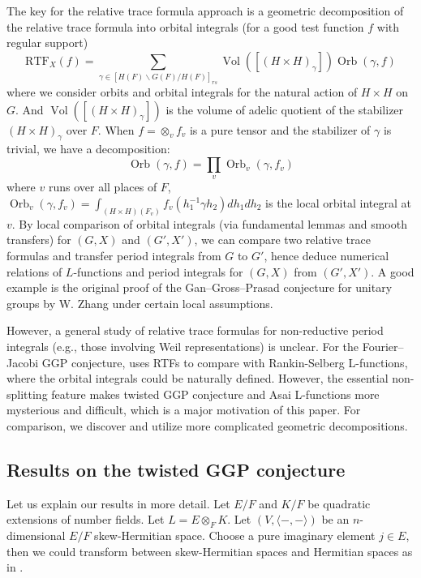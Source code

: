 \documentclass[11pt, reqno]{amsart}
\numberwithin{equation}{subsection}
\theoremstyle{plain}
\theoremstyle{definition}
\DeclareMathOperator{\Orb}{Orb}
\DeclareMathOperator{\Vol}{Vol}
\begin{document}
The key for the relative trace formula approach is a geometric decomposition of the relative trace formula into orbital integrals (for a good test function $f$ with regular support)
\[
\mathrm{RTF}_{X}(f)=\sum_{\gamma \in [H(F)\backslash G(F) / H(F)]_{rs}} \Vol([(H \times H)_\gamma]) \Orb(\gamma, f)
\]
where we consider orbits and orbital integrals for the natural action of $H \times H$ on $G$. And $\Vol([(H \times H)_\gamma])$ is the volume of adelic quotient of the stabilizer $(H \times H)_\gamma$ over $F$. When $f=\otimes_v f_v$ is a pure tensor and the stabilizer of $\gamma$ is trivial, we have a decomposition:
\[
\Orb(\gamma, f)= \prod_v \Orb_v(\gamma, f_v)
\]
where $v$ runs over all places of $F$, $\Orb_v(\gamma, f_v)=\int_{(H \times H)(F_v)} f_v(h_1^{-1} \gamma h_2) dh_1 dh_2$ is the local orbital integral at $v$. By local comparison of orbital integrals (via fundamental lemmas and smooth transfers) for $(G, X)$ and $(G', X')$, we can compare two relative trace formulas and transfer period integrals from $G$ to $G'$, hence deduce numerical relations of $L$-functions and period integrals for $(G, X)$ from $(G', X')$. A good example is the original proof of the Gan--Gross--Prasad conjecture for unitary groups by W. Zhang \cite{WeiIchinoIkeda14,WeiGGP14} under certain local assumptions. 

However, a general study of relative trace formulas for non-reductive period integrals (e.g., those involving Weil representations) is unclear. For the Fourier--Jacobi GGP conjecture, \cite{GGP-FourierJacobi} uses RTFs to compare with Rankin-Selberg L-functions, where the orbital integrals could be naturally defined. However, the essential non-splitting feature makes twisted GGP conjecture \cite{TwistedGGP} and Asai L-functions more mysterious and difficult, which is a major motivation of this paper. For comparison, we discover and utilize more complicated geometric decompositions.



\subsection{Results on the twisted GGP conjecture}

Let us explain our results in more detail. Let $E/F$ and $K/F$ be quadratic
extensions of number fields. Let $L = E \otimes_F K$. Let $(V, \langle -, - \rangle)$ be an $n$-dimensional
$E/F$ skew-Hermitian space. Choose a pure imaginary element $j \in E$, then we could transform between skew-Hermitian spaces and Hermitian spaces as in \cite[Remark 13.1]{GGP-FourierJacobi}.
\end{document}
